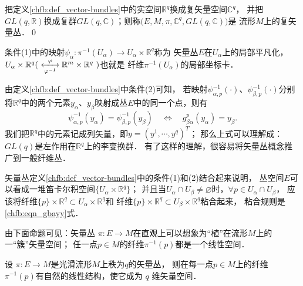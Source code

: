 \begin{definition}
把定义\ref{chfb:def_vector-bundles}中的实空间$\mathbb{R}^q$换成{\kaishu 复}矢量空间$\mathbb{C}^q$，
并把$GL(q,\mathbb{R})$换成复群$GL(q,\mathbb{C})$；则称$\bigl(E,M,\pi,\mathbb{C}^q,GL(q,\mathbb{C})\bigr)$是
流形$M$上的{\heiti 复矢量丛}．\qed
\end{definition}

     


条件(1)中的映射$\psi_\alpha:\pi^{-1}(U_\alpha) \to U_\alpha \times \mathbb{R}^q$称为
矢量丛$E$在$U_\alpha$上的{\heiti 局部平凡化}，
$U_\alpha \times \mathbb{R}^q (\ \xleftrightarrow[\varphi^{-1}]{\varphi} 
\mathbb{R}^m \times \mathbb{R}^q\ )$也就是
纤维$\pi^{-1}(U_\alpha)$的局部坐标卡． 




由定义\ref{chfb:def_vector-bundles}中条件(2)可知，
若映射$\psi^{-1}_{\alpha,p}(\cdot)$、$\psi^{-1}_{\beta,p}(\cdot)$分别
将$\mathbb{R}^q$中的两个元素$y_\alpha$、$y_\beta$映射成丛$E$中的同一个点，则有
\begin{equation}\label{chfb:eqn_gbayy}
    \psi^{-1}_{\alpha,p}(y_\alpha) = \psi^{-1}_{\beta,p}(y_\beta)
    \quad \Leftrightarrow \quad
    g^p_{\beta \alpha}(y_\alpha) = y_\beta .
\end{equation}
我们把$\mathbb{R}^q$中的元素记成列矢量，即$y=(y^1,\cdots, y^q)^T$；
那么上式可以理解成：$GL(q)$是左作用在$\mathbb{R}^q$上的李变换群．
有了这样的理解，很容易将矢量丛概念推广到一般纤维丛．



矢量丛定义\ref{chfb:def_vector-bundles}中的条件(1)和(2)结合起来说明，
丛空间$E$可以看成一堆笛卡尔积空间$\{U_\alpha \times \mathbb{R}^q\}$；
并且当$U_\alpha \cap U_\beta \neq \varnothing$时，$\forall p\in U_\alpha \cap U_\beta$，
应该将纤维$\{p\}\times \mathbb{R}^q \subset U_\alpha \times \mathbb{R}^q$和
纤维$\{p\}\times \mathbb{R}^q \subset U_\beta \times \mathbb{R}^q$粘合起来，
粘合规则是\eqref{chfb:eqn_gbayy}式．

由下面命题可见：矢量丛 $\pi: E \to M$在直观上可以想象为“植”在流形$M$上的一“簇”矢量空间；
任一点$p\in M$的纤维$\pi^{-1}(p)$都是一个线性空间．

\begin{proposition}\label{chfb:thm_linear-space}
设 $\pi: E \rightarrow M$是光滑流形$M$上秩为$q$的矢量丛，
则在每一点$p \in M$上的纤维 $\pi^{-1}(p)$有自然的线性结构，使它成为 $q$ 维矢量空间．
\end{proposition}

